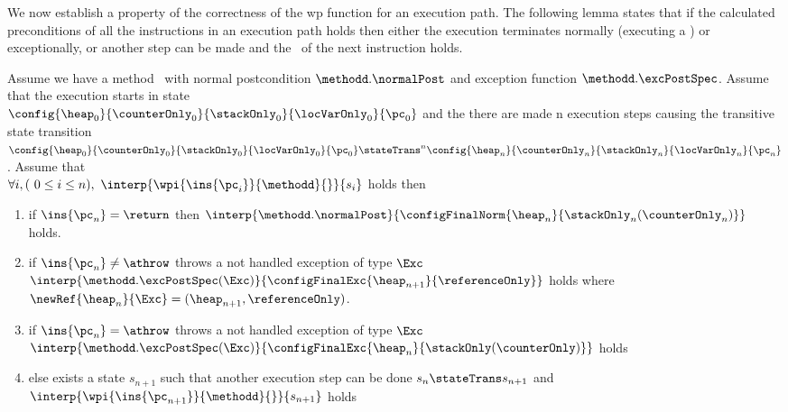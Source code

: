 We now establish a property of the correctness of the wp function  for an execution path. The following lemma states that if the calculated preconditions
of all the instructions in an execution path holds then either the execution terminates normally (executing a \return) or exceptionally, or 
another step can be made and the \fwpi \ of the next instruction holds.



\begin{lemma1}[Progress] \label{lemma1}
Assume we have a method \methodd \ with normal postcondition  $\methodd.\normalPost$ and exception function $\methodd.\excPostSpec$. 
Assume that the  execution starts in state \\
 $ \config{\heap_{0}}{\counterOnly_{0}}{\stackOnly_{0}}{\locVarOnly_{0}}{\pc_{0}}$
and the there are made  n execution steps causing the transitive state transition \\
$ \config{\heap_0}{\counterOnly_0}{\stackOnly_0}{\locVarOnly_0}{\pc_0} \stateTrans^{n} \config{\heap_n}{\counterOnly_n}{\stackOnly_n}{\locVarOnly_n}{\pc_n} $.
Assume that \\
 $ \forall i, (\ 0 \leq i \leq n ) , \ \interp{\wpi{\ins{\pc_{i}} }{ \methodd } {  }}{ s_i } $  
holds then
\begin{enumerate}
	\item if $\ins{\pc_n} = \return$  then $\interp{\methodd.\normalPost} {\configFinalNorm{\heap_n}{\stackOnly_n( \counterOnly_n )}} $ holds.  
	
	\item if $\ins{\pc_n}\neq \athrow  $ throws a not handled exception of type $\Exc$ \\
	$\interp{\methodd.\excPostSpec( \Exc)}{\configFinalExc{ \heap_{n+1}}{  \referenceOnly   } } $ holds 
	where $\newRef{\heap_n}{\Exc} = (\heap_{n+1}, \referenceOnly )$.
	
	 \item if $\ins{\pc_n} = \athrow $ throws a not handled exception of type $\Exc$ \\
	$\interp{\methodd.\excPostSpec( \Exc)}{\configFinalExc{ \heap_{n}}{  \stackOnly (\counterOnly)   } } $ holds 
	
	
	\item else exists a state $s_{n+1}$ such that another execution step can be done 
	 $s_n  \stateTrans s_{n+1}$ and  $\interp{ \wpi{\ins{\pc_{n+1}}}{\methodd}{  } } { s_{n+1} } $  holds
\end{enumerate}
\end{lemma1}


